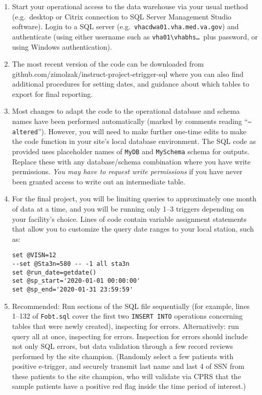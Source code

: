 \documentclass{article}
\begin{document}
\begin{enumerate}

\item Start your operational access to the data warehouse via your
  usual method (e.g.\ desktop or Citrix connection to SQL Server
  Management Studio software). Login to a SQL server
  (e.g.\ \texttt{vhacdwa01.vha.med.va.gov}) and authenticate (using
  either username such as \texttt{vha01\textbackslash{}vhabhs\ldots{}}\ plus
  password, or using Windows authentication).

\item The most recent version of the code can be downloaded from
  github.com/zimolzak/instruct-project-etrigger-sql where you can also
  find additional procedures for setting dates, and guidance about
  which tables to export for final reporting.

\item Most changes to adapt the code to the operational database and
  schema names have been performed automatically (marked by comments
  reading ``\texttt{--altered}''). However, you will need to make
  further one-time edits to make the code function in your site's
  local database environment. The SQL code as provided uses
  placeholder names of \texttt{MyDB} and \texttt{MySchema} schema for
  outputs. Replace these with any database/schema combination where
  you have write permissions. \emph{You may have to request write
    permissions} if you have never been granted access to write out an
  intermediate table.

\item For the final project, you will be limiting queries to
  approximately one month of data at a time, and you will be running
  only 1--3 triggers depending on your facility's choice. Lines of
  code contain variable assignment statements that allow you to
  customize the query date ranges to your local station, such as:

\begin{verbatim}
set @VISN=12
--set @Sta3n=580 -- -1 all sta3n
set @run_date=getdate()
set @sp_start='2020-01-01 00:00:00'
set @sp_end='2020-01-31 23:59:59'
\end{verbatim}

\item Recommended: Run sections of the SQL file sequentially (for
  example, lines 1--132 of \texttt{Fobt.sql} cover the first two
  \texttt{INSERT INTO} operations concerning tables that were newly
  created), inspecting for errors. Alternatively: run query all at
  once, inspecting for errors. Inspection for errors should include
  not only SQL errors, but data validation through a few record
  reviews performed by the site champion. (Randomly select a few
  patients with positive e-trigger, and securely transmit last name
  and last 4 of SSN from these patients to the site champion, who will
  validate via CPRS that the sample patients have a positive red flag
  inside the time period of interest.)


\end{enumerate}
\end{document}
